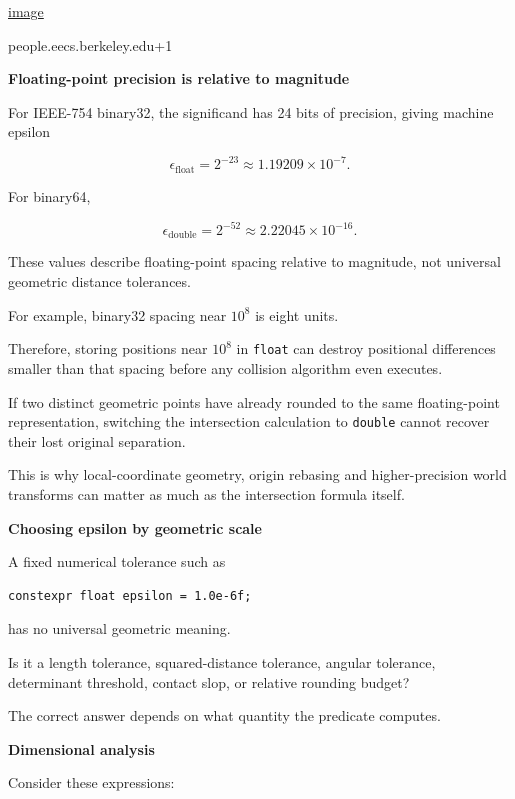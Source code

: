 \href{https://www.google.com/s2/favicons?domain=https://people.eecs.berkeley.edu&sz=32}{image}

people.eecs.berkeley.edu+1

\textbf{Floating-point precision is relative to magnitude}

For IEEE-754 binary32, the significand has 24 bits of precision, giving machine epsilon

\[
\epsilon_{\text{float}}=2^{-23}\approx1.19209\times10^{-7}.
\]

For binary64,

\[
\epsilon_{\text{double}}=2^{-52}\approx2.22045\times10^{-16}.
\]

These values describe floating-point spacing relative to magnitude, not universal geometric distance tolerances.

For example, binary32 spacing near \(10^8\) is eight units.

Therefore, storing positions near \(10^8\) in \texttt{float} can destroy positional differences smaller than that spacing before any collision algorithm even executes.

If two distinct geometric points have already rounded to the same floating-point representation, switching the intersection calculation to \texttt{double} cannot recover their lost original separation.

This is why local-coordinate geometry, origin rebasing and higher-precision world transforms can matter as much as the intersection formula itself.

\textbf{Choosing epsilon by geometric scale}

A fixed numerical tolerance such as

\begin{verbatim}
constexpr float epsilon = 1.0e-6f;
\end{verbatim}

has no universal geometric meaning.

Is it a length tolerance, squared-distance tolerance, angular tolerance, determinant threshold, contact slop, or relative rounding budget?

The correct answer depends on what quantity the predicate computes.

\textbf{Dimensional analysis}

Consider these expressions:

